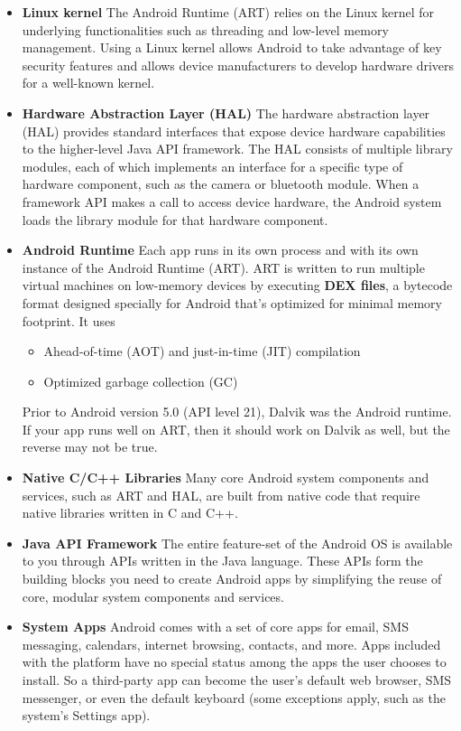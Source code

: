 \begin{itemize}
	\item \textbf{Linux kernel} The Android Runtime (ART) relies on the Linux kernel for underlying functionalities such as threading and low-level memory management.
	Using a Linux kernel allows Android to take advantage of key security features and allows device manufacturers to develop hardware drivers for a well-known kernel.
	\item \textbf{Hardware Abstraction Layer (HAL)} The hardware abstraction layer (HAL) provides standard interfaces that expose device hardware capabilities to the higher-level Java API framework. The HAL consists of multiple library modules, each of which implements an interface for a specific type of hardware component, such as the camera or bluetooth module. When a framework API makes a call to access device hardware, the Android system loads the library module for that hardware component.
	\item \textbf{Android Runtime} Each app runs in its own process and with its own instance of the Android Runtime (ART). ART is written to run multiple virtual machines on low-memory devices by executing \textbf{DEX files}, a bytecode format designed specially for Android that's optimized for minimal memory footprint. It uses
	\begin{itemize}
		\item Ahead-of-time (AOT) and just-in-time (JIT) compilation \cite{}
		\item Optimized garbage collection (GC)
	\end{itemize}
	Prior to Android version 5.0 (API level 21), Dalvik was the Android runtime. If your app runs well on ART, then it should work on Dalvik as well, but the reverse may not be true.
	\item \textbf{Native C/C++ Libraries} Many core Android system components and services, such as ART and HAL, are built from native code that require native libraries written in C and C++. 
	\item \textbf{Java API Framework} The entire feature-set of the Android OS is available to you through APIs written in the Java language. These APIs form the building blocks you need to create Android apps by simplifying the reuse of core, modular system components and services.
	\item \textbf{System Apps} Android comes with a set of core apps for email, SMS messaging, calendars, internet browsing, contacts, and more. Apps included with the platform have no special status among the apps the user chooses to install. So a third-party app can become the user's default web browser, SMS messenger, or even the default keyboard (some exceptions apply, such as the system's Settings app).
	
	
	
	
\end{itemize}


